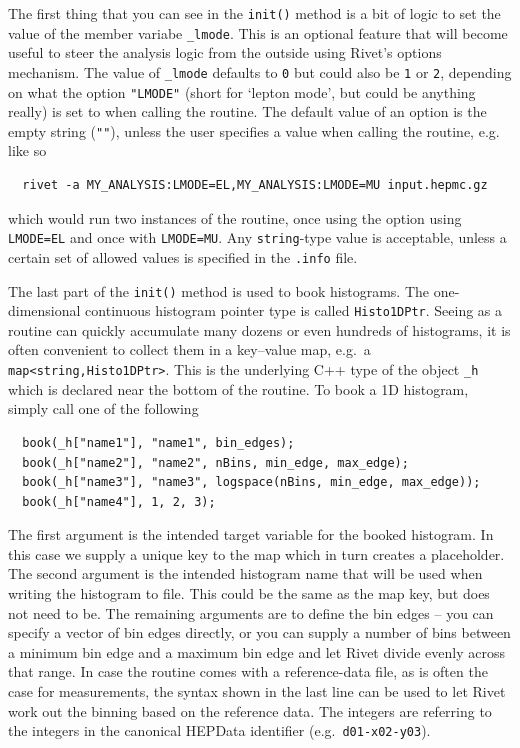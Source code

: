 \documentclass[10pt,fleqn]{scrartcl}
\theoremstyle{exstyle}
\begin{document}
The first thing that you can see in the \verb|init()| method is a bit of logic
to set the value of the member variabe \verb|_lmode|.
This is an optional feature that will become useful to steer the analysis logic
from the outside using Rivet's options mechanism. The value of \verb|_lmode|
defaults to \verb|0| but could also be \verb|1| or \verb|2|, depending on what the option \verb|"LMODE"|
(short for `lepton mode', but could be anything really) is set to when calling the routine.
The default value of an option is the empty string (\verb|""|), unless the user specifies
a value when calling the routine, e.g. like so
\begin{verbatim}
  rivet -a MY_ANALYSIS:LMODE=EL,MY_ANALYSIS:LMODE=MU input.hepmc.gz
\end{verbatim}
which would run two instances of the routine, once using the option using \verb|LMODE=EL| and
once with \verb|LMODE=MU|. Any \verb|string|-type value is acceptable, unless
a certain set of allowed values is specified in the \verb|.info| file.

The last part of the \verb|init()| method is used to book histograms.
The one-dimensional continuous histogram pointer type is called \verb|Histo1DPtr|.
Seeing as a routine can quickly accumulate many dozens or even hundreds
of histograms, it is often convenient to collect them in a key--value
map, e.g.\ a \verb|map<string,Histo1DPtr>|. This is the underlying
C++ type of the object \verb|_h| which is declared near the bottom of the routine.
To book a 1D histogram, simply call one of the following
\begin{verbatim}
  book(_h["name1"], "name1", bin_edges);
  book(_h["name2"], "name2", nBins, min_edge, max_edge);
  book(_h["name3"], "name3", logspace(nBins, min_edge, max_edge));
  book(_h["name4"], 1, 2, 3);
\end{verbatim}
The first argument is the intended target variable for the booked histogram.
In this case we supply a unique key to the map which in turn creates a placeholder.
The second argument is the intended histogram name that will be used when
writing the histogram to file. This could be the same as the map key,
but does not need to be. The remaining arguments are to define the bin edges
-- you can specify a vector of bin edges directly, or you can supply a number
of bins between a minimum bin edge and a maximum bin edge and let Rivet divide
evenly across that range.
In case the routine comes with a reference-data file, as is often the case
for measurements, the syntax shown in the last line can be used to let Rivet
work out the binning based on the reference data. The integers are referring
to the integers in the canonical HEPData identifier (e.g.\ \verb|d01-x02-y03|).
\end{document}
